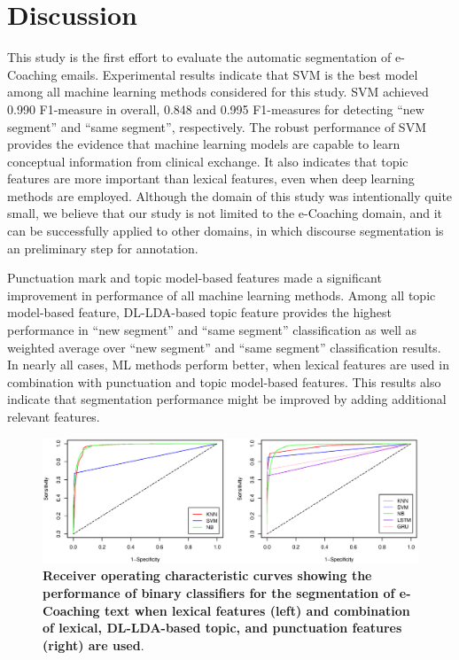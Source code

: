 \documentclass{amia}
\begin{document}
\section*{Discussion}
This study is the first effort to evaluate the automatic segmentation of e-Coaching emails. Experimental results indicate that SVM is the best model among all machine learning methods considered for this study. SVM achieved 0.990 F1-measure in overall, 0.848 and 0.995 F1-measures for detecting ``new segment'' and ``same segment'', respectively. The robust performance of SVM provides the evidence that machine learning models are capable to learn conceptual information from clinical exchange. It also indicates that topic features are more important than lexical features, even when deep learning methods are employed. Although the domain of this study was intentionally quite small, we believe that our study is not limited to the e-Coaching domain, and it can be successfully applied to other domains, in which discourse segmentation is an preliminary step for annotation.

Punctuation mark and topic model-based features made a significant improvement in performance of all machine learning methods. Among all topic model-based feature, DL-LDA-based topic feature provides the highest performance in ``new segment'' and ``same segment'' classification as well as weighted average over ``new segment'' and ``same segment'' classification results. In nearly all cases, ML methods perform better, when lexical features are used in combination with punctuation and topic model-based features. This results also indicate that segmentation performance might be improved by adding additional relevant features.         

\begin{figure}[!htb]
    \centering
    \includegraphics[width=1.0\textwidth]{figures/roc-curves.eps}
    \caption{\textbf{Receiver operating characteristic curves showing the performance of binary classifiers for the segmentation of e-Coaching text when lexical features (left) and combination of lexical, DL-LDA-based topic, and punctuation features (right) are used}.}
    \label{fig:roc-curves}
\end{figure}
\end{document}
